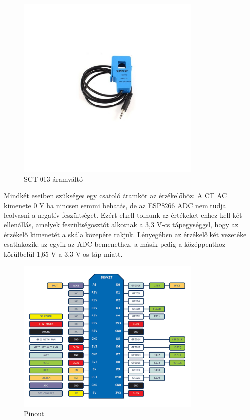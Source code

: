 \begin{figure}[!ht]
    \centering
    \includegraphics[width=0.8\textwidth, keepaspectratio]{figures/CT.jpg}
    \caption{SCT-013 áramváltó \cite{mikroelektronik:sct013}} 
\end{figure}

Mindkét esetben szükséges egy csatoló áramkör az érzékelőhöz: 
A CT AC kimenete 0 V ha nincsen semmi behatás, de az ESP8266 ADC nem tudja leolvasni a negatív feszültséget. 
Ezért elkell tolnunk az értékeket ehhez kell két ellenállás, amelyek feszültségosztót alkotnak 
a 3,3 V-os tápegységgel, hogy az érzékelő kimenetét a skála közepére rakjuk. 
Lényegében az érzékelő két vezetéke csatlakozik: az egyik az ADC bemenethez, 
a másik pedig a középponthoz körülbelül 1,65 V a 3,3 V-os táp miatt.
\cite{openenergymonitor}

\begin{figure}[!ht]
    \centering
    \includegraphics[width=0.8\textwidth, keepaspectratio]{figures/NodeMCU-Devkit-Pinouts.png}
    \caption{Pinout \cite{electronicwings_nodemcu2023}} 
\end{figure}

